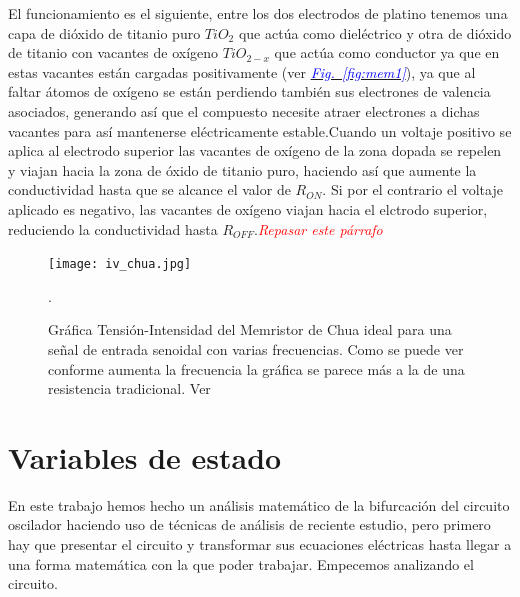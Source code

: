 \documentclass[12pt,a4paper]{report} %
\newcommand{\fref}[1]{\hyperref[#1]{\textcolor{blue}{\textit{Fig.~\ref*{#1}}}}}
\begin{document}
	El funcionamiento es el siguiente, entre los dos electrodos de platino tenemos una capa de dióxido de titanio puro $TiO_2$ que actúa como dieléctrico y otra de dióxido de titanio con vacantes de oxígeno $TiO_{2-x}$ que actúa como conductor ya que en estas vacantes están cargadas positivamente (ver \fref{fig:mem1}), ya que al faltar átomos de oxígeno se están perdiendo también sus electrones de valencia asociados, generando así que el compuesto necesite atraer electrones a dichas vacantes para así mantenerse eléctricamente estable.Cuando un voltaje positivo se aplica al electrodo superior las vacantes de oxígeno de la zona dopada se repelen y viajan hacia la zona de óxido de titanio puro, haciendo así que aumente la conductividad hasta que se alcance el valor de $R_{ON}$. Si por el contrario el voltaje aplicado es negativo, las vacantes de oxígeno viajan hacia el elctrodo superior, reduciendo la conductividad hasta $R_{OFF}$.\textit{\textcolor{red}{Repasar este párrafo}}
	
	\begin{figure}[h]
		\centering
		\texttt{[image: iv\_chua.jpg]}
		\caption{Gráfica Tensión-Intensidad del Memristor de Chua ideal para una señal de entrada senoidal con varias frecuencias. Como se puede ver conforme aumenta la frecuencia la gráfica se parece más a la de una resistencia tradicional. Ver \cite{outsiders}}.
		\label{fig:iv_chua}
	\end{figure}\smallskip

	\newpage
	
	\section{Variables de estado}
	\label{sec:23}
	\noindent En este trabajo hemos hecho un análisis matemático de la bifurcación del circuito oscilador haciendo uso de técnicas de análisis de reciente estudio, pero primero hay que presentar el circuito y transformar sus ecuaciones eléctricas hasta llegar a una forma matemática con la que poder trabajar. Empecemos analizando el circuito.
	
\end{document}
